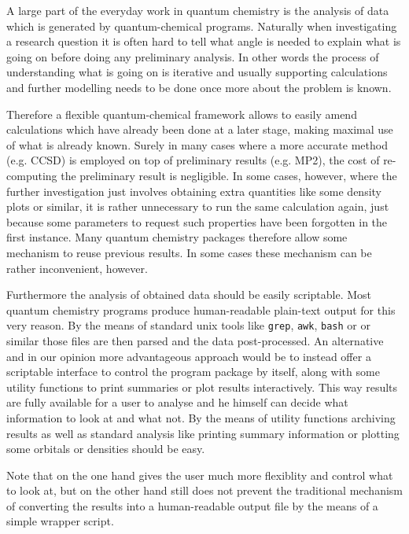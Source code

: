 A large part of the everyday work in quantum chemistry
is the analysis of data which is generated by quantum-chemical programs.
Naturally when investigating a research question it is often
hard to tell what angle is needed to explain what is going on
before doing any preliminary analysis.
In other words the process of understanding what is going on is iterative
and usually supporting calculations and further modelling
needs to be done once more about the problem is known.

Therefore a flexible quantum-chemical framework allows to
easily amend calculations which have already been done
at a later stage, making maximal use of what is already known.
Surely in many cases where a more accurate method (e.g. CCSD) is employed
on top of preliminary results (e.g. MP2),
the cost of re-computing the preliminary result is negligible.
In some cases, however,
where the further investigation just involves obtaining
extra quantities like some density plots or similar,
it is rather unnecessary to run the same calculation again,
just because some parameters to request such properties
have been forgotten in the first instance.
Many quantum chemistry packages therefore allow
some mechanism to reuse previous results.
In some cases these mechanism can be rather inconvenient, however.

Furthermore the analysis of obtained data should be easily scriptable.
Most quantum chemistry programs produce human-readable plain-text output
for this very reason.
By the means of standard unix tools like \texttt{grep}, \texttt{awk},
\texttt{bash} or \python or similar those files are then parsed and
the data post-processed.
An alternative and in our opinion more advantageous approach
would be to instead offer a scriptable interface to control
the program package by itself,
along with some utility functions to print summaries
or plot results interactively.
This way results are fully available for a user to analyse
and he himself can decide what information to look at
and what not.
By the means of utility functions
archiving results as well as standard analysis
like printing summary information or plotting some orbitals or densities
should be easy.

Note that on the one hand gives the user much more flexiblity and control
what to look at,
but on the other hand still does not prevent the traditional
mechanism of converting the results into a human-readable output file
by the means of a simple wrapper script.

